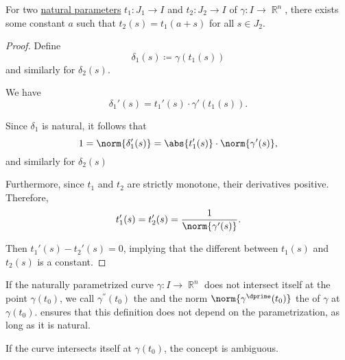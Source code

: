 \begin{lemma}\label{thm:natural_reparametrization_lemma}
  For two \hyperref[def:smooth_curve/natural_parameter]{natural parameters} \( t_1: J_1 \to I \) and \( t_2: J_2 \to I \) of \( \gamma: I \to \BbbR^n \), there exists some constant \( a \) such that \( t_2(s) = t_1(a + s) \) for all \( s \in J_2 \).
\end{lemma}
\begin{proof}
  Define
  \begin{equation*}
    \delta_1(s) \coloneqq \gamma(t_1(s))
  \end{equation*}
  and similarly for \( \delta_2(s) \).

  We have
  \begin{equation*}
    \delta_1'(s) = t_1'(s) \cdot \gamma'(t_1(s)).
  \end{equation*}

  Since \( \delta_1 \) is natural, it follows that
  \begin{equation*}
    1 = \norm{\delta_1'(s)} = \abs{t_1'(s)} \cdot \norm{\gamma'(s)},
  \end{equation*}
  and similarly for \( \delta_2(s) \)

  Furthermore, since \( t_1 \) and \( t_2 \) are strictly monotone, their derivatives positive. Therefore,
  \begin{equation*}
    t_1'(s) = t_2'(s) = \frac 1 {\norm{\gamma'(s)}}.
  \end{equation*}

  Then \( t_1'(s) - t_2'(s) = 0 \), implying that the different between \( t_1(s) \) and \( t_2(s) \) is a constant.
\end{proof}

\begin{definition}\label{def:smooth_curve_curvature}
  If the naturally parametrized curve \( \gamma: I \to \BbbR^n \) does not intersect itself at the point \( \gamma(t_0) \), we call \( \gamma^\dprime(t_0) \) the  and the norm \( \norm{\gamma^\dprime(t_0)} \) the  of \( \gamma \) at \( \gamma(t_0) \).  ensures that this definition does not depend on the parametrization, as long as it is natural.

  If the curve intersects itself at \( \gamma(t_0) \), the concept is ambiguous.
\end{definition}

